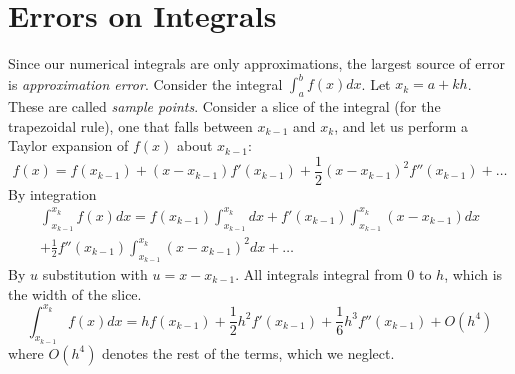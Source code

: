 \section{Errors on Integrals}
    Since our numerical integrals are only approximations, the largest source of error is \textit{approximation error}. Consider the integral $\int_a^b f(x) dx$. Let $x_k = a + kh$. These are called \textit{sample points}. Consider a slice of the integral (for the trapezoidal rule), one that falls between $x_{k-1}$ and $x_k$, and let us perform a Taylor expansion of $f(x)$ about $x_{k-1}$:
    \begin{equation*}
        f(x) = f(x_{k-1}) + (x - x_{k-1})f'(x_{k-1}) + \frac{1}{2}(x - x_{k-1})^2f''(x_{k-1}) + \dots
    \end{equation*}
    By integration
    \begin{align*}
        \int_{x_{k-1}}^{x_k} f(x) dx = f(x_{k-1})\int_{x_{k-1}}^{x_k}dx + f'(x_{k-1})\int_{x_{k-1}}^{x_k}(x - x_{k-1})dx \\
         + \frac{1}{2}f''(x_{k-1})\int_{x_{k-1}}^{x_k}(x - x_{k-1})^2dx + \dots
    \end{align*}
    By $u$ substitution with $u = x - x_{k-1}$. All integrals integral from 0 to $h$, which is the width of the slice. 
    \begin{equation*}
        \int_{x_{k-1}}^{x_k} f(x) dx = hf(x_{k-1}) + \frac{1}{2}h^2f'(x_{k-1}) + \frac{1}{6}h^3f''(x_{k-1}) + O(h^4)
    \end{equation*}
    where $O(h^4)$ denotes the rest of the terms, which we neglect.
